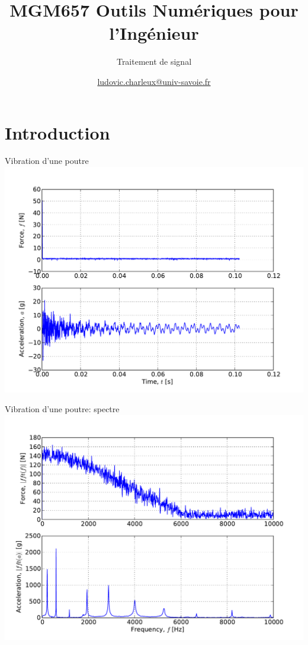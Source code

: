 \documentclass[8pt,a4paper]{beamer}
\author[LC]{\href{mailto:ludovic.charleux@univ-savoie.fr}{ludovic.charleux@univ-savoie.fr}}
\title{MGM657 Outils Numériques pour l'Ingénieur}
\subtitle{Traitement de signal}
\date{}
\institute{\url{www.polytech.univ-savoie.fr}}
\begin{document}
\begin{frame}[plain]
\titlepage
\tableofcontents
\end{frame}

\section{Introduction}

\begin{frame}{Vibration d'une poutre}
\includegraphics[width=.9\textwidth]{../Example_code/flex_vib.pdf}
\end{frame}

\begin{frame}{Vibration d'une poutre: spectre}
\includegraphics[width=.9\textwidth]{../Example_code/flex_vib_spectre.pdf}
\end{frame}
\end{document}

